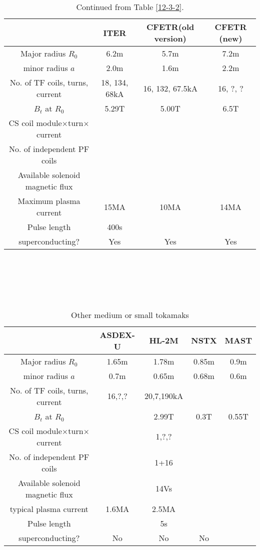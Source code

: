 \documentclass{article}
\begin{document}
\begin{table}[h]
  \begin{tabular}{|c|c|c|c|}
    \hline
    & ITER{\cite{Aymar2002}} & CFETR(old version) & CFETR (new)\\
    \hline
    Major radius $R_0$ & 6.2m & 5.7m & 7.2m\\
    \hline
    minor radius $a$ & 2.0m & 1.6m & 2.2m\\
    \hline
    No. of TF coils, turns, current & 18, 134, 68kA & 16, 132, 67.5kA & 16, ?,
    ?\\
    \hline
    $B_t$ at $R_0$ & 5.29T & 5.00T & 6.5T\\
    \hline
    CS coil module$\times$turn$\times$current &  &  & \\
    \hline
    No. of independent PF coils &  &  & \\
    \hline
    Available solenoid magnetic flux &  &  & \\
    \hline
    Maximum plasma current & 15MA & 10MA & 14MA\\
    \hline
    Pulse length & 400s &  & \\
    \hline
    superconducting? & Yes & Yes & Yes\\
    \hline
  \end{tabular}
  
  \
  \caption{Continued from Table \ref{12-3-2}.}
\end{table}

\

\

\begin{table}[h]
  \begin{tabular}{|c|c|c|c|c|}
    \hline
    & ASDEX-U & HL-2M & NSTX & MAST\\
    \hline
    Major radius $R_0$ & 1.65m & 1.78m & 0.85m & 0.9m\\
    \hline
    minor radius $a$ & 0.7m & 0.65m & 0.68m & 0.6m\\
    \hline
    No. of TF coils, turns, current & 16,?,? & 20,7,190kA &  & \\
    \hline
    $B_t$ at $R_0$ &  & 2.99T & 0.3T & 0.55T\\
    \hline
    CS coil module$\times$turn$\times$current &  & 1,?,? &  & \\
    \hline
    No. of independent PF coils &  & 1+16 &  & \\
    \hline
    Available solenoid magnetic flux &  & 14Vs &  & \\
    \hline
    typical plasma current & 1.6MA & 2.5MA &  & \\
    \hline
    Pulse length &  & 5s &  & \\
    \hline
    superconducting? & No & No & No & \\
    \hline
  \end{tabular}
  
  \
  \caption{Other medium or small tokamaks}
\end{table}
\end{document}
